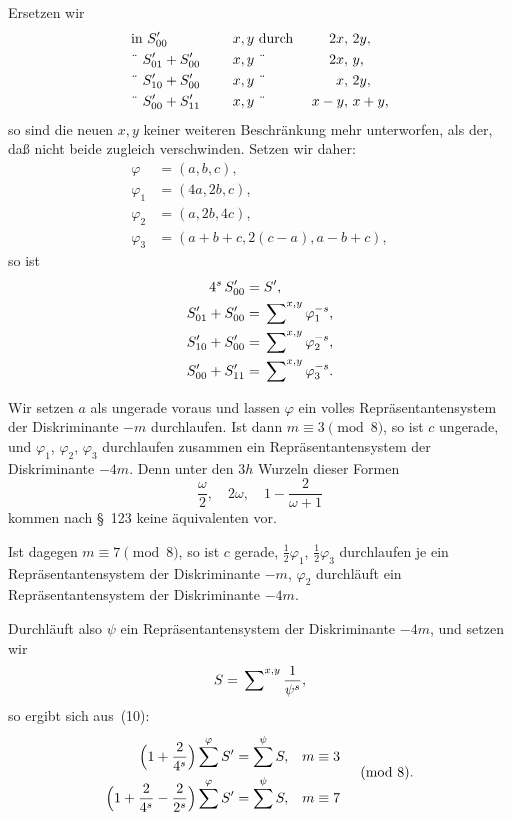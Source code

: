 \documentclass[12pt,a4paper]{article}
\theoremstyle{definition}
\begin{document}
Ersetzen wir
\begin{alignat*}{4}
&\text{in}\ S'_{00} &\quad x, y\ &\text{durch}\ & 2x,\ &2y,\\
&\text{\"{ }}\ S'_{01} + S'_{00}\ &\quad x, y\ &\text{\"{ }}\ & 2x,\ &y,\\
&\text{\"{ }}\ S'_{10} + S'_{00}\ &\quad x, y\ &\text{\"{ }}\ & x,\ &2y,\\
&\text{\"{ }}\ S'_{00} + S'_{11}\ &\quad x, y\ &\text{\"{ }}\ & x-y,\ &x+y,
\end{alignat*}
so sind die neuen $x, y$ keiner weiteren Beschränkung mehr unterworfen, als 
der, daß nicht beide zugleich verschwinden. Setzen wir daher:
\begin{equation}
\begin{aligned}
\varphi &= (a, b, c),\\
\varphi_{1} &= (4a, 2b, c),\\
\varphi_{2} &= (a, 2b, 4c),\\
\varphi_{3} &= (a + b + c, 2(c-a), a - b + c),
\end{aligned}
\end{equation}
so ist
\begin{equation}
\begin{aligned}
4^{s}\,S'_{00} &= S',\\
S'_{01} + S'_{00} &= \sideset{}{^{x,y}}\sum\varphi_{1}^{-s},\\
S'_{10} + S'_{00} &= \sideset{}{^{x,y}}\sum\varphi_{2}^{-s},\\
S'_{00} + S'_{11} &= \sideset{}{^{x,y}}\sum\varphi_{3}^{-s}.
\end{aligned}
\end{equation}

Wir setzen $a$ als ungerade voraus und lassen $\varphi$ ein volles 
Repräsentantensystem der Diskriminante $-m$ durchlaufen. Ist dann 
$m \equiv 3 \pmod 8$, so ist $c$ ungerade, und $\varphi_{1}$, $\varphi_{2}$, 
$\varphi_{3}$ durchlaufen zusammen ein Repräsentantensystem der 
Diskriminante $-4m$. Denn unter den $3h$ Wurzeln dieser Formen
\[
\frac{\omega}{2},\quad 2\omega,\quad 1 - \frac{2}{\omega + 1}
\]
kommen nach \S~123 keine äquivalenten vor.

Ist dagegen $m \equiv 7 \pmod 8$, so ist $c$ gerade, 
$\frac{1}{2}\varphi_{1}$, $\frac{1}{2}\varphi_{3}$ durchlaufen je ein 
Repräsentantensystem der Diskriminante $-m$, $\varphi_{2}$ durchläuft ein 
Repräsentantensystem der Diskriminante $-4m$.

Durchläuft also $\psi$ ein Repräsentantensystem der Diskriminante $-4m$, 
und setzen wir
\begin{equation}
S = \sideset{}{^{x,y}}\sum\frac{1}{\psi^{s}},
\end{equation}
so ergibt sich aus~(10):
\begin{equation}
\begin{aligned}
\Bigl(1 + \frac{2}{4^{s}}\Bigr)\sum^{\varphi} S' &= \sum^{\psi} S,
&m &\equiv 3\\
\Bigl(1 + \frac{2}{4^{s}} - \frac{2}{2^{s}}\Bigr)\sum^{\varphi} S'
&= \sum^{\psi} S,
&m &\equiv 7
\end{aligned}
\quad\pmod 8.
\end{equation}
\end{document}
